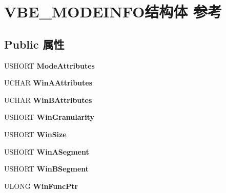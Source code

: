 \hypertarget{struct_v_b_e___m_o_d_e_i_n_f_o}{}\section{V\+B\+E\+\_\+\+M\+O\+D\+E\+I\+N\+F\+O结构体 参考}
\label{struct_v_b_e___m_o_d_e_i_n_f_o}
\subsection*{Public 属性}
\begin{DoxyCompactItemize}
\item 
\mbox{\label{struct_v_b_e___m_o_d_e_i_n_f_o_a24873bf0f94e685f5fb33520ba71e616}} 
U\+S\+H\+O\+RT {\bfseries Mode\+Attributes}
\item 
\mbox{\label{struct_v_b_e___m_o_d_e_i_n_f_o_a90e2e0cdf3e30b72f59b58ba8ef818d2}} 
U\+C\+H\+AR {\bfseries Win\+A\+Attributes}
\item 
\mbox{\label{struct_v_b_e___m_o_d_e_i_n_f_o_a7419da5e39467980a2a265d717997032}} 
U\+C\+H\+AR {\bfseries Win\+B\+Attributes}
\item 
\mbox{\label{struct_v_b_e___m_o_d_e_i_n_f_o_afe6a1e62ef72378db8c9d33f368acaef}} 
U\+S\+H\+O\+RT {\bfseries Win\+Granularity}
\item 
\mbox{\label{struct_v_b_e___m_o_d_e_i_n_f_o_a4e28cd18f9d63ce911c3722a9a92a0fe}} 
U\+S\+H\+O\+RT {\bfseries Win\+Size}
\item 
\mbox{\label{struct_v_b_e___m_o_d_e_i_n_f_o_a9d60abe9f28be6e0c4ce266c95ea55aa}} 
U\+S\+H\+O\+RT {\bfseries Win\+A\+Segment}
\item 
\mbox{\label{struct_v_b_e___m_o_d_e_i_n_f_o_a42083d6c3abed586068f8d301c276068}} 
U\+S\+H\+O\+RT {\bfseries Win\+B\+Segment}
\item 
\mbox{\label{struct_v_b_e___m_o_d_e_i_n_f_o_aa197742ab4788e93dbe89be6834b618c}} 
U\+L\+O\+NG {\bfseries Win\+Func\+Ptr}

\end{DoxyCompactItemize}
